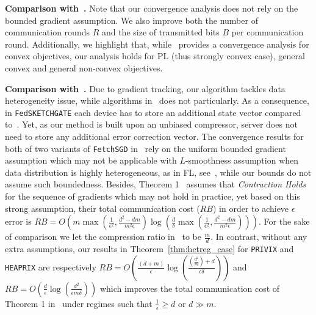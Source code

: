 \documentclass{article}
\begin{document}
\noindent\textbf{Comparison with~\citet{li2019privacy}.} Note that our convergence analysis does not rely on the bounded gradient assumption. We also improve both the number of communication rounds $R$ and the size of transmitted bits $B$ per communication round. 
Additionally, we highlight that, while~\citep{li2019privacy} provides a convergence analysis for convex objectives, our analysis holds for PL (thus strongly convex case), general convex and general non-convex objectives.

\noindent\textbf{Comparison with~\citet{rothchild2020fetchsgd}.}
Due to gradient tracking, our algorithm tackles data heterogeneity issue, while algorithms in~\citet{rothchild2020fetchsgd} does not particularly. 
As a consequence, in \texttt{FedSKETCHGATE} each device has to store an additional state vector compared to~\citet{rothchild2020fetchsgd}. 
Yet, as our method is built upon an unbiased compressor, server does not need to store any additional error correction vector.
The convergence results for both of two variants of \texttt{FetchSGD} in~\citet{rothchild2020fetchsgd} rely on the uniform bounded gradient assumption which may not be applicable with $L$-smoothness assumption when data distribution is highly heterogeneous, as in FL, see~\citep{bayoumi2020tighter}, while our bounds do not assume such boundedness.
Besides, Theorem 1~\citep{rothchild2020fetchsgd} assumes that \emph{Contraction Holds} for the sequence of gradients which may not hold in practice, yet based on this strong assumption, their total communication cost ($RB$) in order to achieve $\epsilon$ error is $RB=O\left(m\max(\frac{1}{\epsilon^2},\frac{d^2-dm}{m^2\epsilon})\log\left(\frac{d}{\delta}\max(\frac{1}{\epsilon^2},\frac{d^2-dm}{m^2\epsilon})\right)\right)$.
For the sake of comparison we let the compression ratio in~\citet{rothchild2020fetchsgd} to be $\frac{m}{d}$. 
In contrast, without any extra assumptions, our results in Theorem~\ref{thm:hetreg_case} for \texttt{PRIVIX} and \texttt{HEAPRIX} are respectively $RB=O(\frac{(d+m)}{\epsilon}\log(\frac{{(\frac{d^2}{m})}+d}{\epsilon\delta}))$ and $RB=O(\frac{d}{\epsilon}\log(\frac{d^2}{\epsilon m\delta}))$ which improves the total communication cost of Theorem 1 in~\citet{rothchild2020fetchsgd} under regimes such that $\frac{1}{\epsilon}\geq d$ or $d\gg m$. 
\end{document}
